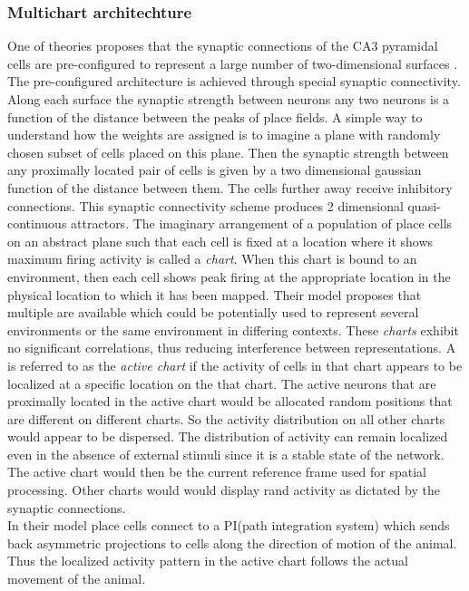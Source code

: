 \subsubsection{Multichart architechture}
\label{pathIntegration}
One of theories proposes that the synaptic connections of the CA3 pyramidal cells are pre-configured to represent a large number of two-dimensional surfaces \cite{Samsonovich1997}. The pre-configured architecture is achieved through special synaptic connectivity. Along each surface the synaptic strength between neurons any two neurons is a function of the distance between the peaks of place fields.  %
A simple way to understand how the weights are assigned is to imagine a plane with randomly chosen subset of cells placed on this plane. Then the synaptic strength between any proximally located pair of cells is given by a two dimensional gaussian function of the distance between them. The cells further away receive inhibitory connections. This synaptic connectivity scheme produces 2 dimensional quasi-continuous attractors. The imaginary arrangement of a population of place cells on an abstract plane such that each  cell is fixed at a location where it shows maximum firing activity is called a \emph{chart}. When this chart is bound to an environment, then each cell shows peak firing at the appropriate location in the physical location to which it has been mapped. Their model proposes that multiple  are available which could be potentially used to represent several environments or the same environment in differing contexts. These \emph{charts} exhibit no significant correlations, thus reducing  interference between representations. A  is referred to as the \emph{active chart} if the activity of cells in that chart appears to be localized at a specific location on the that chart. The active neurons that are proximally located in the active chart would be allocated random positions that are different on different charts. So the activity distribution on all other charts would appear to be dispersed. The distribution of activity can remain localized even in the absence of external stimuli since it is a stable state of the network. The active chart would then be the current reference frame used for spatial processing. Other charts would would display rand activity as dictated by the synaptic connections. \\
In their model place cells connect to a PI(path integration system) which sends back asymmetric projections to cells along the direction of motion of the animal. Thus the localized activity pattern in the active chart follows the actual movement of the animal.

